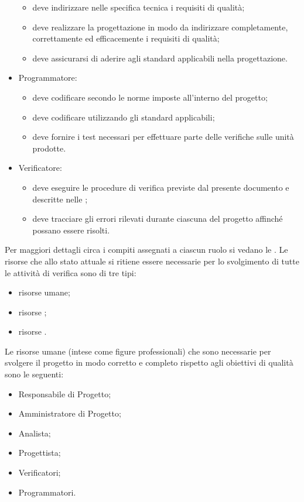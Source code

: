 \begin{itemize}
\begin{itemize}
					\item deve indirizzare nelle specifica tecnica i requisiti di qualità;
					\item deve realizzare la progettazione in modo da indirizzare completamente, correttamente ed efficacemente i requisiti di qualità;
					\item deve assicurarsi di aderire agli standard applicabili nella progettazione.
				\end{itemize}
				\item Programmatore:
				\begin{itemize}
					\item deve codificare secondo le norme imposte all'interno del progetto;
					\item deve codificare utilizzando gli standard applicabili;
					\item deve fornire i test necessari per effettuare parte delle verifiche sulle unità  prodotte.
				\end{itemize}
				\item Verificatore:
				\begin{itemize}
					\item deve eseguire le procedure di verifica previste dal presente documento e descritte nelle ;
					\item deve tracciare gli errori rilevati durante ciascuna  del progetto affinché possano essere risolti.
				\end{itemize}
			\end{itemize}
			Per maggiori dettagli circa i compiti assegnati a ciascun ruolo si vedano le .
				Le risorse che allo stato attuale si ritiene essere necessarie per lo svolgimento di tutte le attività di verifica 
				sono di tre tipi:
				\begin{itemize}
					\item risorse umane;
					\item risorse ;
					\item risorse .
				\end{itemize}
					Le risorse umane (intese come figure professionali) che sono necessarie per svolgere il progetto in modo corretto e completo 
					rispetto agli obiettivi di qualità sono le seguenti:
					\begin{itemize}
						\item Responsabile di Progetto;
						\item Amministratore di Progetto;
						\item Analista;
						\item Progettista;
						\item Verificatori;
						\item Programmatori.
					\end{itemize}
